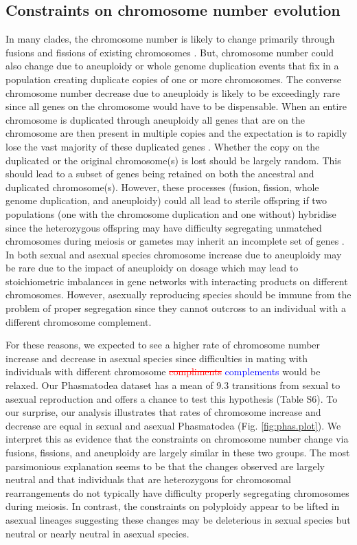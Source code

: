 \documentclass[]{rsos}%
\begin{document}
\subsection{Constraints on chromosome number evolution}
In many clades, the chromosome number is likely to change primarily through fusions and fissions of existing chromosomes \cite{sved2016, blackmon2019meiotic}.
But, chromosome number could also change due to aneuploidy or whole genome duplication events that fix in a population creating duplicate copies of one or more chromosomes.
The converse chromosome number decrease due to aneuploidy is likely to be exceedingly rare since all genes on the chromosome would have to be dispensable.
When an entire chromosome is duplicated through aneuploidy all genes that are on the chromosome are then present in multiple copies and the expectation is to rapidly lose the vast majority of these duplicated genes \cite{ohno}.
Whether the copy on the duplicated or the original chromosome(s) is lost should be largely random.
This should lead to a subset of genes being retained on both the ancestral and duplicated chromosome(s).
However, these processes (fusion, fission, whole genome duplication, and aneuploidy) could all lead to sterile offspring if two populations (one with the chromosome duplication and one without) hybridise since the heterozygous offspring may have difficulty segregating unmatched chromosomes during meiosis or gametes may inherit an incomplete set of genes \cite{white1978}.
In both sexual and asexual species chromosome increase due to aneuploidy may be rare due to the impact of aneuploidy on dosage which may lead to stoichiometric imbalances in gene networks with interacting products on different chromosomes.
However, asexually reproducing species should be immune from the problem of proper segregation since they cannot outcross to an individual with a different chromosome complement. 

For these reasons, we expected to see a higher rate of chromosome number increase and decrease in asexual species since difficulties in mating with
individuals with different chromosome \textcolor{red}{\st{compliments}} \textcolor{blue}{complements} would be relaxed.
Our Phasmatodea dataset has a mean of 9.3 transitions from sexual to asexual reproduction and offers a chance to test this hypothesis (Table S6).
To our surprise, our analysis illustrates that rates of chromosome increase and decrease are equal in sexual and asexual Phasmatodea (Fig. \ref{fig:phas.plot}).
We interpret this as evidence that the constraints on chromosome number change via fusions, fissions, and aneuploidy are largely similar in these two groups. 
The most parsimonious explanation seems to be that the changes observed are largely neutral and that individuals that are heterozygous for chromosomal rearrangements do not typically have difficulty properly segregating chromosomes during meiosis.
In contrast, the constraints on polyploidy appear to be lifted in asexual lineages suggesting these changes may be deleterious in sexual species but neutral or nearly neutral in asexual species.
\end{document}
